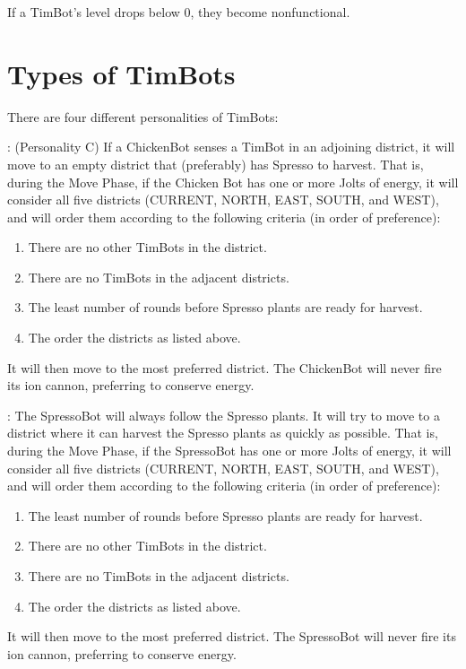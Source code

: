 \documentclass[12pt,pdftex]{article}
\begin{document}
If a TimBot's level drops below 0, they become nonfunctional.


\section*{Types of TimBots}
There are four different personalities of TimBots:
\begin{description}\NoItemSpace
\item[ChickenBot]: (Personality C)  
     If a ChickenBot senses a TimBot in an adjoining
     district, it will move to an empty district that (preferably)
     has Spresso to harvest.  That is, during the Move Phase, if
     the Chicken Bot has one or more Jolts of energy, it will
     consider all five districts (CURRENT, NORTH, EAST, SOUTH, and
     WEST), and will order them according to the following criteria 
     (in order of preference):
     \begin{enumerate}\NoItemSpace
     \item There are no other TimBots in the district.
     \item There are no TimBots in the adjacent districts.
     \item The least number of rounds before Spresso plants are ready for
           harvest.
     \item The order the districts as listed above.
     \end{enumerate}
     It will then move to the most preferred district.  The ChickenBot
     will never fire its ion cannon, preferring to conserve energy.

\item[SpressoBot]: The SpressoBot will always follow the Spresso plants.
     It will try to move to a district where it can harvest the Spresso 
     plants as quickly as possible.  That is, during the Move Phase, if
     the SpressoBot has one or more Jolts of energy, it will consider all 
     five districts (CURRENT, NORTH, EAST, SOUTH, and WEST), and will 
     order them according to the following criteria (in order of preference):
     \begin{enumerate}\NoItemSpace
     \item The least number of rounds before Spresso plants are ready for
           harvest.
     \item There are no other TimBots in the district.
     \item There are no TimBots in the adjacent districts.
     \item The order the districts as listed above.
     \end{enumerate}
     It will then move to the most preferred district.  The SpressoBot
     will never fire its ion cannon, preferring to conserve energy.


\end{description}
\end{document}

